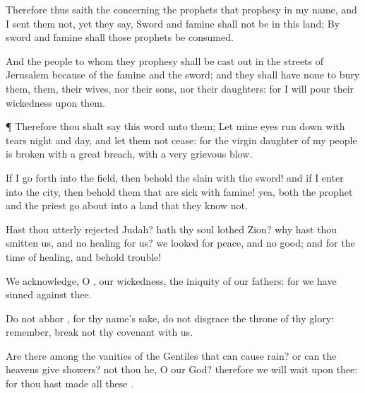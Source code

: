 {Therefore thus
saith the
{} concerning the
prophets that
prophesy in my
name, and I
sent them not, yet they
say,
Sword and
famine shall not be in this
land; By
sword and
famine shall those
prophets be
consumed.

And the
people to whom they
prophesy shall be cast
out in the
streets of
Jerusalem
because of the
famine and the
sword; and they shall have none to
bury
them, them, their
wives, nor their
sons, nor their
daughters: for I will
pour their
wickedness upon them.


\par }{\PP {}¶ Therefore thou shalt
say this
word unto them; Let mine
eyes run
down with
tears
night and
day, and let them not
cease: for the
virgin
daughter of my
people is
broken with a
great
breach, with a
very
grievous
blow.

If I go
forth into the
field, then behold the
slain with the
sword! and if I
enter into the
city, then behold them that are
sick with
famine! yea, both the
prophet and the
priest go
about into a
land that they
know not.

Hast thou
utterly
rejected
Judah? hath thy
soul
lothed
Zion? why hast thou
smitten us, and
{} no
healing for us? we
looked for
peace, and
{} no
good; and for the
time of
healing, and behold
trouble!

We
acknowledge, O
{}, our
wickedness,
{} the
iniquity of our
fathers: for we have
sinned against thee.

Do not
abhor
{}, for thy
name’s sake, do not
disgrace the
throne of thy
glory:
remember,
break not thy
covenant with us.

Are
there
{} among the
vanities of the
Gentiles that can cause
rain? or can the
heavens
give
showers?
{} not thou he, O
{} our
God? therefore we will
wait upon thee: for thou hast
made all these
{}.




\par }
